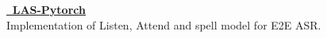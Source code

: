 % 
% 
% 


\textcolor{SlateGrey}{\textbf{\href{https://github.com/jiwidi/las-pytorch}{\faGithub \, LAS-Pytorch }}} \\ 
Implementation of Listen, Attend and spell model for E2E ASR.
\newline
\vspace{1pt}

\newline
\vspace{1pt}

